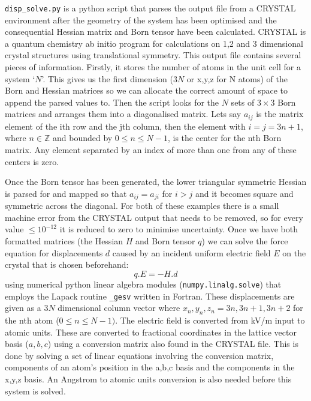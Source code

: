 \texttt{disp\_solve.py} is a python script that parses the output file from a CRYSTAL environment after the geometry of the system has been optimised and the consequential Hessian matrix and Born tensor have been calculated. CRYSTAL is a quantum chemistry ab initio program for calculations on 1,2 and 3 dimensional crystal structures using translational symmetry. This output file contains several pieces of information. Firstly, it stores the number of atoms in the unit cell for a system `$N$'. This gives us the first dimension ($3N$ or x,y,z for N atoms) of the Born and Hessian matrices so we can allocate the correct amount of space to append the parsed values to. Then the script looks for the $N$ sets of $3\times3$ Born matrices and arranges them into a diagonalised matrix. Lets say $a_{ij}$ is the matrix element of the ith row and the jth column, then the element with $i = j = 3n+1$, where $n \in \mathbb{Z}$ and bounded by $0 \leq n \leq N-1$, is the center for the nth Born matrix. Any element separated by an index of more than one from any of these centers is zero.

Once the Born tensor has been generated, the lower triangular symmetric Hessian is parsed for and mapped so that $a_{ij} = a_{ji}$ for $i > j$ and it becomes square and symmetric across the diagonal. For both of these examples there is a small machine error from the CRYSTAL output that needs to be removed, so for every value $\leq 10^{-12}$ it is reduced to zero to minimise uncertainty. Once we have both formatted matrices (the Hessian $H$ and Born tensor $q$) we can solve the force equation for displacements $d$ caused by an incident uniform electric field $E$ on the crystal that is chosen beforehand:
\begin{equation*}
q.E = -H.d
\end{equation*}
using numerical python linear algebra modules (\texttt{numpy.linalg.solve}) that employs the Lapack routine \texttt{\_gesv} written in Fortran. These displacements are given as a $3N$ dimensional column vector where $x_n,y_n,z_n = 3n, 3n+1, 3n+2$ for the nth atom ($0\leq n \leq N-1)$. The electric field is converted from kV/m input to atomic units. These are converted to fractional coordinates in the lattice vector basis ($a,b,c$) using a conversion matrix also found in the CRYSTAL file. This is done by solving a set of linear equations involving the conversion matrix, components of an atom's position in the a,b,c basis and the components in the x,y,z basis. An Angstrom to atomic units conversion is also needed before this system is solved.

